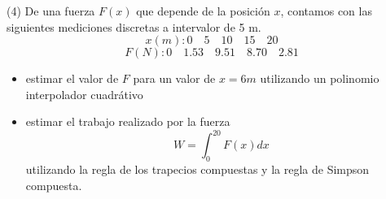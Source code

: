 \noindent (4) De una fuerza $F(x)$ que depende de la posición $x$, contamos con las siguientes mediciones discretas a intervalor de 5 m.
\[ x(m): 0 \quad 5 \quad 10 \quad 15 \quad 20 \]
\[ F(N): 0 \quad 1.53 \quad 9.51 \quad 8.70 \quad 2.81 \]
\begin{itemize}
    \item estimar el valor de $F$ para un valor de $x = 6m$ utilizando un polinomio interpolador cuadrátivo
    \item estimar el trabajo realizado por la fuerza
    \[ W = \int_{0}^{20} F(x) dx \]
    utilizando la regla de los trapecios compuestas y la regla de Simpson compuesta.
\end{itemize}